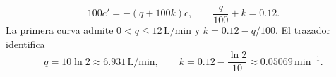 \[
100c'=-(q+100k)c,\qquad \frac q{100}+k=0.12.
\]
La primera curva admite \(0<q\le12\,\mathrm{L/min}\) y \(k=0.12-q/100\). El trazador identifica
\[
q=10\ln2\approx6.931\,\mathrm{L/min},\qquad
k=0.12-\frac{\ln2}{10}\approx0.05069\,\mathrm{min}^{-1}.
\]
